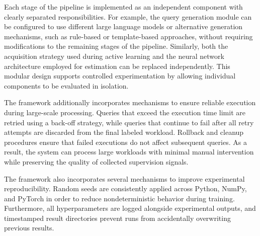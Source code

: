Each stage of the pipeline is implemented as an independent component with clearly separated responsibilities. For example, the query generation module can be configured to use different large language models or alternative generation mechanisms, such as rule-based or template-based approaches, without requiring modifications to the remaining stages of the pipeline. Similarly, both the acquisition strategy used during active learning and the neural network architecture employed for estimation can be replaced independently. This modular design supports controlled experimentation by allowing individual components to be evaluated in isolation.

The framework additionally incorporates mechanisms to ensure reliable execution during large-scale processing. Queries that exceed the execution time limit are retried using a back-off strategy, while queries that continue to fail after all retry attempts are discarded from the final labeled workload. Rollback and cleanup procedures ensure that failed executions do not affect subsequent queries. As a result, the system can process large workloads with minimal manual intervention while preserving the quality of collected supervision signals.

The framework also incorporates several mechanisms to improve experimental reproducibility. Random seeds are consistently applied across Python, NumPy, and PyTorch in order to reduce nondeterministic behavior during training. Furthermore, all hyperparameters are logged alongside experimental outputs, and timestamped result directories prevent runs from accidentally overwriting previous results.